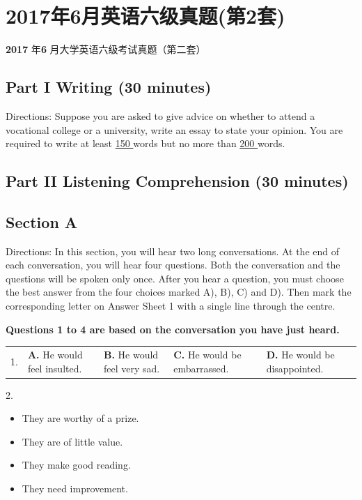 \documentclass[UTF8,11pt]{ctexart}
\begin{document}
\section*{2017年6月英语六级真题(第2套)}
\textbf{2017} 年\textbf{6} 月大学英语六级考试真题（第二套）


\subsection*{\textbf{Part I Writing (30 minutes)}}


Directions: Suppose you are asked to give advice on whether to attend a vocational college or a university, write an essay to state your opinion. You are required to write at least \uline{150 }words but no more than \uline{200 }words.


\subsection*{\textbf{Part II Listening Comprehension (30 minutes)}}


\subsection*{\textbf{Section A}}


Directions: In this section, you will hear two long conversations. At the end of each conversation, you will hear four questions. Both the conversation and the questions will be spoken only once. After you hear a question, you must choose the best answer from the four choices marked A), B), C) and D). Then mark the corresponding letter on Answer Sheet 1 with a single line through the centre.


\textbf{Questions 1 to 4 are based on the conversation you have just heard.}


\noindent\begin{tabularx}{\linewidth}{@{}lXXXX@{}}1. & \textbf{A.} He would feel insulted. & \textbf{B.} He would feel very sad. & \textbf{C.} He would be embarrassed. & \textbf{D.} He would be disappointed.\\\end{tabularx}\par

2.


\begin{itemize}[leftmargin=2em,itemsep=.2em,topsep=.4em]\item[A.] They are worthy of a prize.
\item[B.] They are of little value.
\item[C.] They make good reading.
\item[D.] They need improvement.
\end{itemize}
\end{document}
